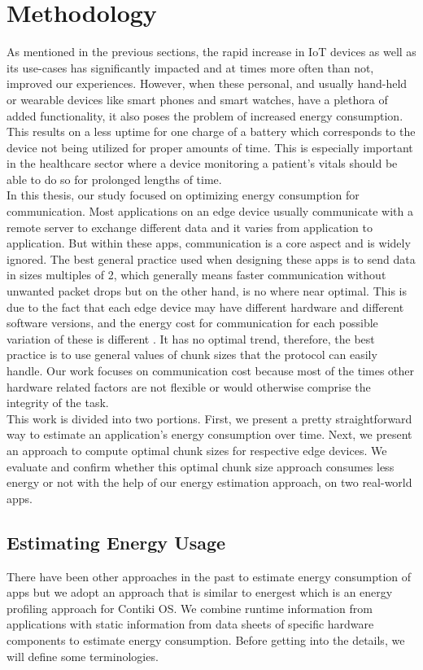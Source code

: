 \chapter{Methodology}
\newtheorem{definition}{Definition}
As mentioned in the previous sections, the rapid increase in IoT devices as well as its use-cases has 
significantly impacted and at times more often than not, improved our experiences. However, when these 
personal, and usually hand-held or wearable devices like smart phones and smart watches, have a 
plethora of added functionality, it also poses the problem of increased energy consumption. This results 
on a less uptime for one charge of a battery which corresponds to the device not being utilized for proper 
amounts of time. This is especially important in the healthcare sector where a device monitoring a patient's 
vitals should be able to do so for prolonged lengths of time. \\
In this thesis, our study focused on optimizing energy consumption for communication. Most applications 
on an edge device usually communicate with a remote server to exchange different data and it varies from 
application to application. But within these apps, communication is a core aspect and is widely ignored. 
The best general practice used when designing these apps is to send data in sizes multiples of 2, which 
generally means faster communication without unwanted packet drops but on the other hand, is no where near 
optimal. This is due to the fact that each edge device may have different hardware and different software 
versions, and the energy cost for communication for each possible variation of these is different \cite{6200281}. It has no 
optimal trend, therefore, the best practice is to use general values of chunk sizes that the protocol 
can easily handle. Our work focuses on communication cost because most of the times other hardware related 
factors are not flexible or would otherwise comprise the integrity of the task. \\

This work is divided into two portions. First, we present a pretty straightforward way to estimate an 
application's energy consumption over time. Next, we present an approach to compute optimal chunk sizes 
for respective edge devices. We evaluate and confirm whether this optimal chunk size approach consumes less 
energy or not with the help of our energy estimation approach, on two real-world apps. \\
\section{Estimating Energy Usage}
There have been other approaches in the past to estimate energy consumption of apps \cite{6606555} but we 
adopt an approach that is similar to energest \cite{energest} which is an energy profiling approach for Contiki OS. 
We combine runtime information from applications with static information from data sheets of specific 
hardware components to estimate energy consumption. Before getting into the details, we will define some 
terminologies. \\

